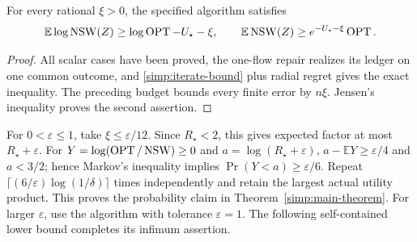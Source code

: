 \begin{theorem}\label{simp:finite-theorem}
For every rational $\xi>0$, the specified algorithm satisfies
\[
 \mathbb E\log\operatorname{NSW}(Z)\ge\log\operatorname{OPT}-U_\star-\xi,
 \qquad \mathbb E\operatorname{NSW}(Z)\ge e^{-U_\star-\xi}\operatorname{OPT}.
\]
\end{theorem}
\begin{proof}
All scalar cases have been proved, the one-flow repair realizes its
ledger on one common outcome, and \eqref{simp:iterate-bound} plus radial
regret gives the exact inequality. The preceding budget bounds every
finite error by $n\xi$. Jensen's inequality proves the second assertion.
\end{proof}
For $0<\varepsilon\le1$, take $\xi\le\varepsilon/12$.
Since $R_\star<2$, this gives expected factor at most $R_\star+\varepsilon$.
For $Y=\log(\operatorname{OPT}/\operatorname{NSW})\ge0$ and $a=\log(R_\star+\varepsilon)$,
$a-\mathbb EY\ge\varepsilon/4$ and $a<3/2$; hence Markov's inequality
implies $\Pr(Y<a)\ge\varepsilon/6$.
Repeat $\lceil(6/\varepsilon)\log(1/\delta)\rceil$ times independently
and retain the largest actual utility product. This proves the probability
claim in Theorem~\ref{simp:main-theorem}. For larger $\varepsilon$, use
the algorithm with tolerance $\varepsilon=1$.
The following self-contained lower bound completes its infimum assertion.
